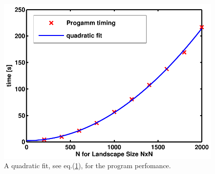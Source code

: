 \begin{figure}
 \includegraphics{Figures/TimingFitO5.pdf}
\caption{A quadratic fit, see eq.(\ref{fig:fitting curve}), for the program perfomance.}
\label{fig:fitting curve}
\end{figure}








